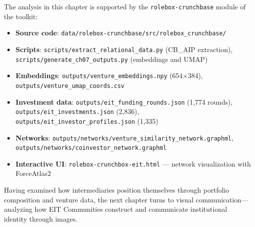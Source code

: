 \documentclass[../main.tex]{subfiles}
\begin{document}
\vspace{0.5em}
\begin{replicationbox}
The analysis in this chapter is supported by the \texttt{rolebox-crunchbase} module of the \RoleBox{} toolkit:
\begin{itemize}[leftmargin=*, itemsep=0.2em]
\item \textbf{Source code}: \texttt{data/rolebox-crunchbase/src/rolebox\_crunchbase/}
\item \textbf{Scripts}: \texttt{scripts/extract\_relational\_data.py} (CB\_AIP extraction), \texttt{scripts/generate\_ch07\_outputs.py} (embeddings and UMAP)
\item \textbf{Embeddings}: \texttt{outputs/venture\_embeddings.npy} (654$\times$384), \texttt{outputs/venture\_umap\_coords.csv}
\item \textbf{Investment data}: \texttt{outputs/eit\_funding\_rounds.json} (1,774 rounds), \texttt{outputs/eit\_investments.json} (2,836), \texttt{outputs/eit\_investor\_profiles.json} (1,335)
\item \textbf{Networks}: \texttt{outputs/networks/venture\_similarity\_network.graphml}, \texttt{outputs/networks/coinvestor\_network.graphml}
\item \textbf{Interactive UI}: \texttt{rolebox-crunchbox-eit.html} --- network visualization with ForceAtlas2
\end{itemize}
\end{replicationbox}

\vspace{1em}
Having examined how intermediaries position themselves through portfolio composition and venture data, the next chapter turns to visual communication---analyzing how EIT Communities construct and communicate institutional identity through images.
\end{document}

